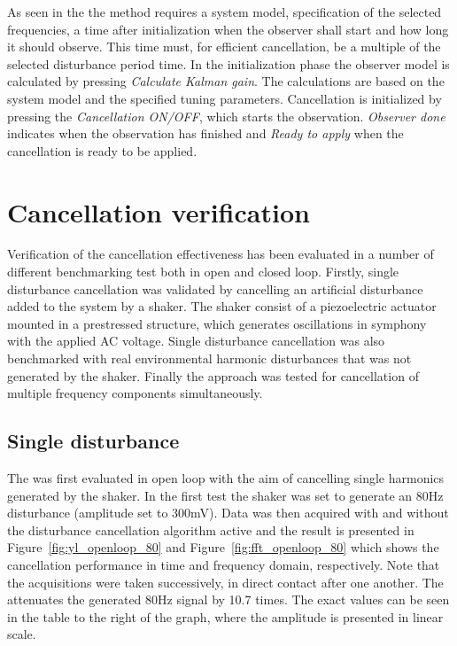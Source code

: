 As seen in the \abbrGUI the method requires a system model, specification of the selected frequencies, a time after initialization when the observer shall start and how long it should observe. This time must, for efficient cancellation, be a multiple of the selected disturbance period time. In the initialization phase the observer model is calculated by pressing \emph{Calculate Kalman gain}. The calculations are based on the system model and the specified tuning parameters. Cancellation is initialized by pressing the \emph{Cancellation ON/OFF}, which starts the observation. \emph{Observer done} indicates when the observation has finished and \emph{Ready to apply} when the cancellation is ready to be applied.

\section{Cancellation verification}
Verification of the cancellation effectiveness has been evaluated in a number of different benchmarking test both in open and closed loop. Firstly, single disturbance cancellation was validated by cancelling an artificial disturbance added to the system by a shaker. The shaker consist of a piezoelectric actuator mounted in a prestressed structure, which generates oscillations in symphony with the applied AC voltage. Single disturbance cancellation was also benchmarked with real environmental harmonic disturbances that was not generated by the shaker. Finally the approach was tested for cancellation of multiple frequency components simultaneously.

\subsection{Single disturbance}
The \abbrRFDC was first evaluated in open loop with the aim of cancelling single harmonics generated by the shaker. In the first test the shaker was set to generate an 80Hz disturbance (amplitude set to 300mV). Data was then acquired with and without the disturbance cancellation algorithm active and the result is presented in Figure~\ref{fig:yl_openloop_80} and Figure~\ref{fig:fft_openloop_80} which shows the cancellation performance in time and frequency domain, respectively. Note that the acquisitions were taken successively, in direct contact after one another. The \abbrRFDC attenuates the generated 80Hz signal by 10.7 times. The exact values can be seen in the table to the right of the graph, where the amplitude is presented in linear scale.

